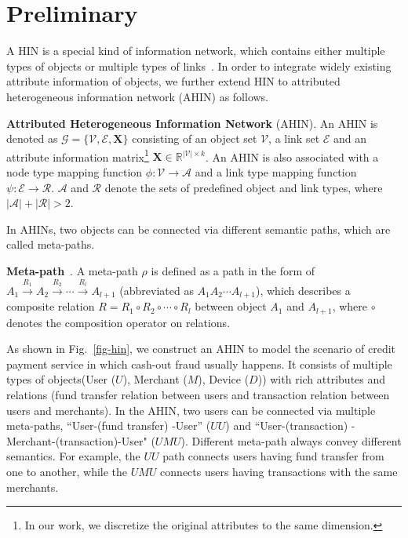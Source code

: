 \section{Preliminary}
A HIN is a special kind of information network, which contains either multiple types of objects or multiple types of links~\citep{sun2012mining}. In order to integrate widely existing attribute information of objects, we further extend HIN to attributed heterogeneous information network (AHIN) as follows.
\begin{myDef}
\textbf{Attributed Heterogeneous Information Network} (AHIN). An AHIN is denoted as $\mathcal{G} = \{\mathcal{V}, \mathcal{E}, \mathbf{X}\}$ consisting of an object set $\mathcal{V}$, a link set $\mathcal{E}$ and an attribute information matrix\footnote{ In our work, we discretize the original attributes to the same dimension. } $\mathbf{X} \in \mathbb{R}^{|\mathcal{V}| \times k}$. An AHIN is also associated with a node type mapping function $\phi: \mathcal{V} \rightarrow \mathcal{A}$ and a link type mapping function $\psi: \mathcal{E} \rightarrow \mathcal{R}$. $\mathcal{A}$ and $\mathcal{R}$ denote the sets of predefined object and link types, where $|\mathcal{A}| + |\mathcal{R}| > 2$.
\end{myDef}

In AHINs, two objects can be connected via different semantic paths, which are called meta-paths.
\begin{myDef}
\textbf{Meta-path}~\citep{sun2011pathsim}. A meta-path $\rho$ is defined as a path in the form of $A_1 \xrightarrow{R_1} A_2 \xrightarrow{R_2} \cdots \xrightarrow{R_l} A_{l+1}$ (abbreviated as $A_1A_2 \cdots A_{l+1}$), which describes a composite relation $R = R_1 \circ R_2 \circ \cdots \circ R_l$ between object $A_1$ and $A_{l+1}$, where $\circ$ denotes the composition operator on relations.
\end{myDef}

\begin{exmp}
As shown in Fig.~\ref{fig-hin}, we construct an AHIN to model the scenario of credit payment service in which cash-out fraud usually happens. It consists of multiple types of objects(\ie User ($U$), Merchant ($M$), Device ($D$)) with rich attributes and relations (\ie fund transfer relation between users and transaction relation between users and merchants). In the AHIN, two users can be connected via multiple meta-paths, \eg ``User-\scriptsize (fund transfer) \normalsize-User'' ($UU$) and ``User-\scriptsize (transaction) \normalsize-Merchant-\scriptsize (transaction)\normalsize -User" ($UMU$). Different meta-path always convey different semantics. For example, the $UU$ path connects users having fund transfer from one to another, while the $UMU$ connects users having transactions with the same merchants. 
\end{exmp}

